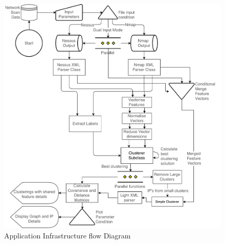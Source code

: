 \begin{figure}
\centering
\includegraphics[width=4.5in]{./Figures/flow.pdf}
\caption{Application Infrastructure flow Diagram}
\label{flow}
\end{figure}